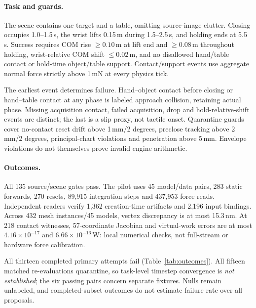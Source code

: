 \paragraph{Task and guards.}
The scene contains one target and a table, omitting source-image clutter. Closing occupies 1.0--1.5\,s, the wrist lifts 0.15\,m during 1.5--2.5\,s, and holding ends at 5.5\,s. Success requires COM rise $\geq0.10$\,m at lift end and $\geq0.08$\,m throughout holding, wrist-relative COM shift $\leq0.02$\,m, and no disallowed hand/table contact or hold-time object/table support. Contact/support events use aggregate normal force strictly above 1\,mN at every physics tick.

The earliest event determines failure. Hand--object contact before closing or hand--table contact at any phase is labeled approach collision, retaining actual phase. Missing acquisition contact, failed acquisition, drop and hold-relative-shift events are distinct; the last is a slip proxy, not tactile onset. Quarantine guards cover no-contact reset drift above 1\,mm/2 degrees, preclose tracking above 2\,mm/2 degrees, principal-chart violations and penetration above 5\,mm. Envelope violations do not themselves prove invalid engine arithmetic.

\paragraph{Outcomes.}
All 135 source/scene gates pass. The pilot uses 45 model/data pairs, 283 static forwards, 270 resets, 89,915 integration steps and 437,953 force reads. Independent readers verify 1,362 creation-time artifacts and 2,196 input bindings. Across 432 mesh instances/45 models, vertex discrepancy is at most 15.3\,nm. At 218 contact witnesses, 57-coordinate Jacobian and virtual-work errors are at most $4.16\times10^{-17}$ and $6.66\times10^{-16}$\,W: local numerical checks, not full-stream or hardware force calibration.

All thirteen completed primary attempts fail (Table~\ref{tab:outcomes}). All fifteen matched re-evaluations quarantine, so task-level timestep convergence is \emph{not established}; the six passing pairs concern separate fixtures. Nulls remain unlabeled, and completed-subset outcomes do not estimate failure rate over all proposals.

